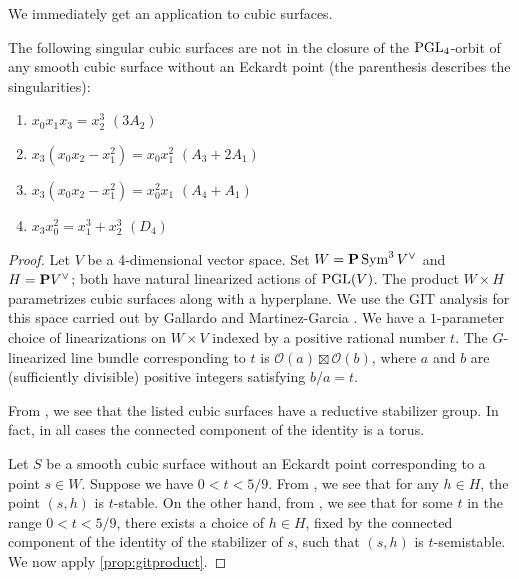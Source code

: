 \documentclass[12pt,reqno]{amsart}
\numberwithin{equation}{section}
\renewcommand{\O}{\mathcal O}
\begin{document}
We immediately get an application to cubic surfaces.
\begin{proposition}\label{prop:isogood}
  The following singular cubic surfaces are not in the closure of the $\PGL_4$-orbit of any smooth cubic surface without an Eckardt point (the parenthesis describes the singularities):
  \begin{enumerate}
  \item $x_0x_1x_3 = x_2^3$ \quad $(3A_2)$
  \item $x_3(x_0x_2-x_1^2) = x_0x_1^2$ \quad $(A_3 + 2A_1)$
  \item $x_3(x_0x_2-x_1^2) = x_0^2x_1$ \quad $(A_4 + A_1)$
  \item $x_3x_0^2 = x_1^3 + x_2^3$ \quad $(D_4)$
  \end{enumerate}
\end{proposition}
\begin{proof}
  Let $V$ be a 4-dimensional vector space.
  Set $W = \P \Sym^3 V^\vee$ and $H = \P V^\vee$; both have natural linearized actions of $\PGL(V)$.
  The product $W \times H$ parametrizes cubic surfaces along with a hyperplane.
  We use the GIT analysis for this space carried out by Gallardo and Martinez-Garcia \cite{gal.mar:19}.
  We have a $1$-parameter choice of linearizations on $W \times V$ indexed by a positive rational number $t$.
  The $G$-linearized line bundle corresponding to $t$ is $\O(a) \boxtimes \O(b)$, where $a$ and $b$ are (sufficiently divisible) positive integers satisfying $b/a = t$.

  From \cite[Theorem~3]{sak:10}, we see that the listed cubic surfaces have a reductive stabilizer group.
  In fact, in all cases the connected component of the identity is a torus.

  Let $S$ be a smooth cubic surface without an Eckardt point corresponding to a point $s \in W$.
  Suppose we have $0 < t < 5/9$.
  From \cite[Theorem~2]{gal.mar:19}, we see  that for any $h \in H$, the point $(s,h)$ is $t$-stable.
  On the other hand, from \cite[Table 2]{gal.mar:19}, we see that for some $t$ in the range $0 < t < 5/9$, there exists a choice of $h \in H$, fixed by the connected component of the identity of the stabilizer of $s$, such that $(s,h)$ is $t$-semistable.
  We now apply \autoref{prop:gitproduct}.


\end{proof}
\end{document}
